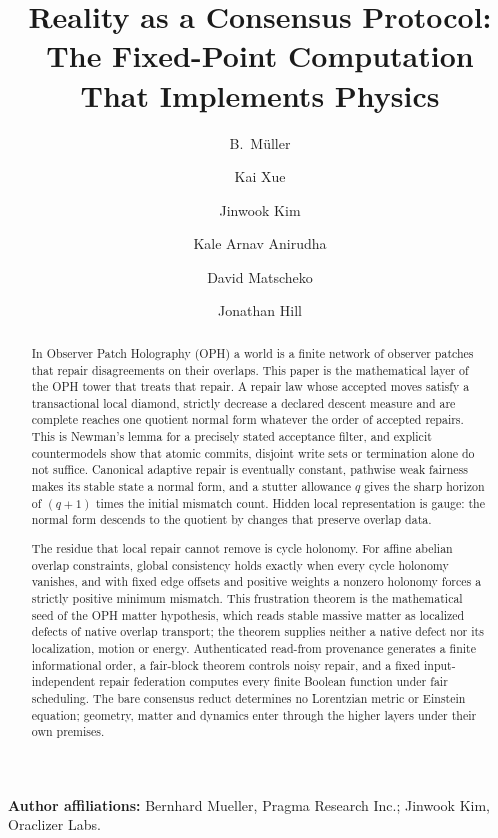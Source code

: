 \documentclass[11pt]{article}
\title{Reality as a Consensus Protocol:\\
The Fixed-Point Computation That Implements Physics}
\author{B.\ M\"uller \and Kai Xue \and Jinwook Kim \and Kale Arnav Anirudha \and David Matscheko \and Jonathan Hill}
\date{\OPHPaperReleaseDate}
\theoremstyle{remark}
\theoremstyle{plain}
\begin{document}
\maketitle
\OPHPaperReleaseBanner

\begin{center}
\small\textbf{Author affiliations:} Bernhard Mueller, Pragma Research Inc.;
Jinwook Kim, Oraclizer Labs.
\end{center}

\begin{abstract}
In Observer Patch Holography (OPH) a world is a finite network of observer
patches that repair disagreements on their overlaps. This paper is the
mathematical layer of the OPH tower that treats that repair. A repair law
whose accepted moves satisfy a transactional local diamond, strictly
decrease a declared descent measure and are complete reaches one quotient
normal form whatever the order of accepted repairs. This is Newman's lemma
for a precisely stated acceptance filter, and explicit countermodels show
that atomic commits, disjoint write sets or termination alone do not
suffice. Canonical adaptive repair is eventually constant, pathwise weak
fairness makes its stable state a normal form, and a stutter allowance \(q\)
gives the sharp horizon of \((q+1)\) times the initial mismatch count.
Hidden local representation is gauge: the normal form descends to the
quotient by changes that preserve overlap data.

The residue that local repair cannot remove is cycle holonomy. For affine
abelian overlap constraints, global consistency holds exactly when every
cycle holonomy vanishes, and with fixed edge offsets and positive weights a
nonzero holonomy forces a strictly positive minimum mismatch. This
frustration theorem is the mathematical seed of the OPH matter hypothesis,
which reads stable massive matter as localized defects of native overlap
transport; the theorem supplies neither a native defect nor its
localization, motion or energy. Authenticated read-from provenance
generates a finite informational order, a fair-block theorem controls noisy
repair, and a fixed input-independent repair federation computes every
finite Boolean function under fair scheduling. The bare consensus reduct
determines no Lorentzian metric or Einstein equation; geometry, matter and
dynamics enter through the higher layers under their own premises.
\end{abstract}




\end{document}
